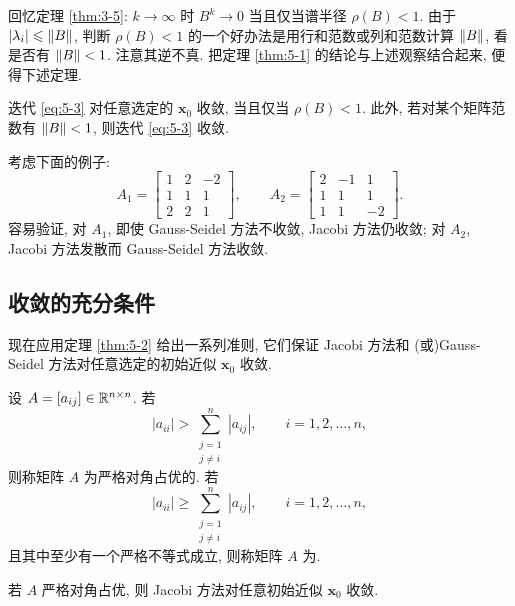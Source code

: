 回忆定理 \ref{thm:3-5}: $k\to\infty$ 时 $B^k\to0$ 当且仅当谱半径 $\rho(B)<1$. 由于 $|\lambda_i|\leqslant\left\|B\right\|$, 判断 $\rho(B)<1$ 的一个好办法是用行和范数或列和范数计算 $\left\|B\right\|$, 看是否有 $\left\|B\right\|<1$. 注意其逆不真. 把定理 \ref{thm:5-1} 的结论与上述观察结合起来, 便得下述定理.

\begin{theorem}
\label{thm:5-2}
迭代 \eqref{eq:5-3} 对任意选定的 $\mathbf{x}_0$ 收敛, 当且仅当 $\rho(B)<1$. 此外, 若对某个矩阵范数有 $\left\|B\right\|<1$, 则迭代 \eqref{eq:5-3} 收敛.
\end{theorem}

考虑下面的例子:
\[
  A_1=
  \begin{bmatrix}
    1 & 2 & -2\\
    1 & 1 & 1\\
    2 & 2 & 1
  \end{bmatrix},
  \qquad
  A_2=
  \begin{bmatrix}
    2 & -1 & 1\\
    1 & 1 & 1\\
    1 & 1 & -2
  \end{bmatrix}.
\]
容易验证, 对 $A_1$, 即使 Gauss-Seidel 方法不收敛, Jacobi 方法仍收敛; 对 $A_2$, Jacobi 方法发散而 Gauss-Seidel 方法收敛.

\subsection{收敛的充分条件}
\label{subsec:5-2-2}

现在应用定理 \ref{thm:5-2} 给出一系列准则, 它们保证 Jacobi 方法和 (或)Gauss-Seidel 方法对任意选定的初始近似 $\mathbf{x}_0$ 收敛.

\begin{definition}
\label{def:5-1}
设 $A=[a_{ij}]\in\mathbb{R}^{n\times n}$. 若
\[
  |a_{ii}|>\sum_{\substack{j=1\\ j\neq i}}^{n}|a_{ij}|,
  \qquad i=1,2,\ldots,n,
\]
则称矩阵 $A$ 为严格对角占优的. 若
\[
  |a_{ii}|\geqslant\sum_{\substack{j=1\\ j\neq i}}^{n}|a_{ij}|,
  \qquad i=1,2,\ldots,n,
\]
且其中至少有一个严格不等式成立, 则称矩阵 $A$ 为.
\end{definition}

\begin{theorem}
\label{thm:5-3}
若 $A$ 严格对角占优, 则 Jacobi 方法对任意初始近似 $\mathbf{x}_0$ 收敛.
\end{theorem}

